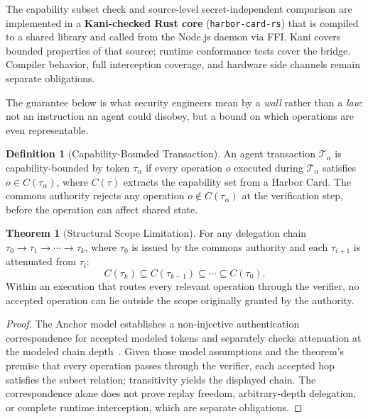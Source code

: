 \documentclass[11pt,a4paper]{article}
\theoremstyle{definition}
\newtheorem{definition}{Definition}[section]
\newtheorem{theorem}{Theorem}[section]
\theoremstyle{remark}
\begin{document}
The capability subset check and source-level secret-independent comparison are implemented in a \textbf{Kani-checked Rust core} (\texttt{harbor-card-rs}) that is compiled to a shared library and called from the Node.js daemon via FFI. Kani covers bounded properties of that source; runtime conformance tests cover the bridge. Compiler behavior, full interception coverage, and hardware side channels remain separate obligations.

The guarantee below is what security engineers mean by a \emph{wall} rather than a \emph{law}: not an instruction an agent could disobey, but a bound on which operations are even representable.

\begin{definition}[Capability-Bounded Transaction]\label{def:cap-txn}
An agent transaction $\mathcal{T}_\alpha$ is capability-bounded by token $\tau_\alpha$ if every operation $o$ executed during $\mathcal{T}_\alpha$ satisfies $o \in C(\tau_\alpha)$, where $C(\tau)$ extracts the capability set from a Harbor Card. The commons authority rejects any operation $o \notin C(\tau_\alpha)$ at the verification step, before the operation can affect shared state.
\end{definition}

\begin{theorem}[Structural Scope Limitation]\label{thm:scope}
For any delegation chain $\tau_0 \rightarrow \tau_1 \rightarrow \cdots \rightarrow \tau_k$, where $\tau_0$ is issued by the commons authority and each $\tau_{i+1}$ is attenuated from $\tau_i$:
\[
C(\tau_k) \subseteq C(\tau_{k-1}) \subseteq \cdots \subseteq C(\tau_0).
\]
Within an execution that routes every relevant operation through the verifier, no
accepted operation can lie outside the scope originally granted by the authority.
\end{theorem}

\begin{proof}
The Anchor model establishes a non-injective authentication correspondence for accepted modeled tokens and separately checks attenuation at the modeled chain depth~\cite{owens2026anchor}. Given those model assumptions and the theorem's premise that every operation passes through the verifier, each accepted hop satisfies the subset relation; transitivity yields the displayed chain. The correspondence alone does not prove replay freedom, arbitrary-depth delegation, or complete runtime interception, which are separate obligations.
\end{proof}
\end{document}
